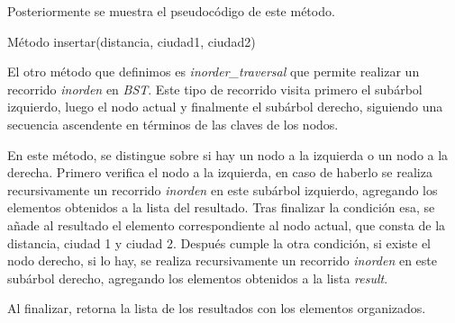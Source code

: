 \documentclass[12pt,oneside]{book}
\begin{document}
Posteriormente se muestra el pseudocódigo de este método.
\newpage
\begin{algorithm}[H]
    \SetAlgoLined
    \caption{Método insertar(distancia, ciudad1, ciudad2)}
\end{algorithm}
\newpage

El otro método que definimos es \textit{inorder\_traversal} que permite realizar un recorrido \textit{inorden} en \textit{BST}.  Este tipo de recorrido visita primero el subárbol izquierdo, luego el nodo actual y finalmente el subárbol derecho, siguiendo una secuencia ascendente en términos de las claves de los nodos.

En este método, se distingue sobre si hay un nodo a la izquierda o un nodo a la derecha. Primero verifica el nodo a la izquierda, en caso de haberlo se realiza recursivamente un recorrido \textit{inorden} en este subárbol izquierdo, agregando los elementos obtenidos a la lista del resultado. Tras finalizar la condición esa, se añade al resultado el elemento correspondiente al nodo actual, que consta de la distancia, ciudad 1 y ciudad 2. Después cumple la otra condición, si existe el nodo derecho, si lo hay, se realiza recursivamente un recorrido \textit{inorden} en este subárbol derecho, agregando los elementos obtenidos a la lista \textit{result}.

Al finalizar, retorna la lista de los resultados con los elementos organizados.
\end{document}
